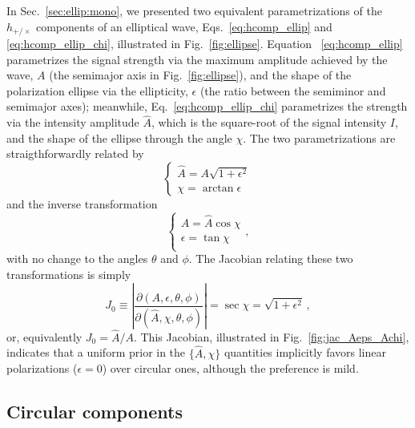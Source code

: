 \documentclass[aps,prd,twocolumn,superscriptaddress,preprintnumbers,floatfix,nofootinbib]{revtex4-2}
\begin{document}
In Sec.~\ref{sec:ellip:mono}, we presented two equivalent parametrizations of the $h_{+/\times}$ components of an elliptical wave, Eqs.~\eqref{eq:hcomp_ellip} and \eqref{eq:hcomp_ellip_chi}, illustrated in Fig.~\ref{fig:ellipse}.
Equation ~\eqref{eq:hcomp_ellip} parametrizes the signal strength via the maximum amplitude achieved by the wave, $A$ (the semimajor axis in Fig.~\ref{fig:ellipse}), and the shape of the polarization ellipse via the ellipticity, $\epsilon$ (the ratio between the semiminor and semimajor axes);
meanwhile, Eq.~\eqref{eq:hcomp_ellip_chi} parametrizes the strength via the intensity amplitude $\hat{A}$, which is the square-root of the signal intensity $I$, and the shape of the ellipse through the angle $\chi$.
The two parametrizations are straigthforwardly related by
\begin{equation} \label{eq:Aellip_Ahatchi}
\begin{cases}
\hat{A} = A \sqrt{1 + \epsilon^2} \\
\chi = \arctan \epsilon 
\end{cases} 
\end{equation}
and the inverse transformation
\begin{equation} \label{eq:Ahatchi_Aellip}
\begin{cases}
A = \hat{A} \cos \chi \\
\epsilon = \tan \chi \\
\end{cases} ,
\end{equation}
with no change to the angles $\theta$ and $\phi$.
The Jacobian relating these two transformations is simply
\begin{equation} \label{eq:jac_Aeps_Achi}
J_0 \equiv \left| \frac{\partial(A,\epsilon,\theta,\phi)}{\partial(\hat{A}, \chi, \theta, \phi)}\right| =  \sec \chi = \sqrt{1 + \epsilon^2} \, ,
\end{equation}
or, equivalently $J_0 = \hat{A}/A$.
This Jacobian, illustrated in Fig.~\ref{fig:jac_Aeps_Achi}, indicates that a uniform prior in the $\{\hat{A}, \chi\}$ quantities implicitly favors linear polarizations ($\epsilon = 0$) over circular ones, although the preference is mild.

\subsection{Circular components}
\label{sec:jac:Arl}
\end{document}

